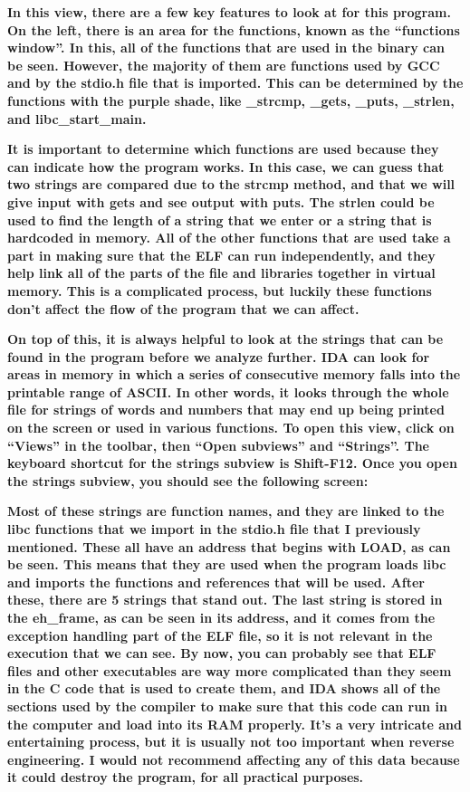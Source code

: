 \textbf{In this view, there are a few key features to look at for this program. On the left, there is an area for the
functions, known as the ``functions window''. In this, all of the functions that are used in the binary can be seen.
However, the majority of them are functions used by GCC and by the stdio.h file that is imported. This can be
determined by the functions with the purple shade, like \_strcmp, \_gets, \_puts, \_strlen, and libc\_start\_main.}

\textbf{It is important to determine which functions are used because they can indicate how the program works. In this
case, we can guess that two strings are compared due to the strcmp method, and that we will give input with gets and
see output with puts. The strlen could be used to find the length of a string that we enter or a string that is
hardcoded in memory. All of the other functions that are used take a part in making sure that the ELF can run
independently, and they help link all of the parts of the file and libraries together in virtual memory. This is a
complicated process, but luckily these functions don't affect the flow of the program that we can affect.}

\textbf{On top of this, it is always helpful to look at the strings that can be found in the program before we analyze
further. IDA can look for areas in memory in which a series of consecutive memory falls into the printable range of
ASCII. In other words, it looks through the whole file for strings of words and numbers that may end up being printed
on the screen or used in various functions. To open this view, click on ``Views'' in the toolbar, then ``Open
subviews'' and ``Strings''. The keyboard shortcut for the strings subview is Shift-F12. Once you open the strings
subview, you should see the following screen:}

  
 \textbf{Most of these strings are function names, and they are linked to the libc functions that we import in the
stdio.h file that I previously mentioned. These all have an address that begins with LOAD, as can be seen. This means
that they are used when the program loads libc and imports the functions and references that will be used. After these,
there are 5 strings that stand out. The last string is stored in the eh\_frame, as can be seen in its address, and it
comes from the exception handling part of the ELF file, so it is not relevant in the execution that we can see. By now,
you can probably see that ELF files and other executables are way more complicated than they seem in the C code that is
used to create them, and IDA shows all of the sections used by the compiler to make sure that this code can run in the
computer and load into its RAM properly. It's a very intricate and entertaining process, but it is usually not too
important when reverse engineering. I would not recommend affecting any of this data because it could destroy the
program, for all practical purposes.}

